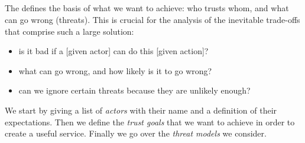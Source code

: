 \subsection{\rot}

The \rot defines the basis of what we want to achieve: who trusts whom, and what can go wrong (threats).
This is crucial for the analysis of the inevitable trade-offs that comprise such a large solution:

\begin{itemize}
    \item is it bad if a [given actor] can do this [given action]?
    \item what can go wrong, and how likely is it to go wrong?
    \item can we ignore certain threats because they are unlikely enough?
\end{itemize}

We start by giving a list of \emph{actors} with their name and a definition of their expectations.
Then we define the \emph{trust goals} that we want to achieve in order to create a useful service.
Finally we go over the \emph{threat models} we consider.
